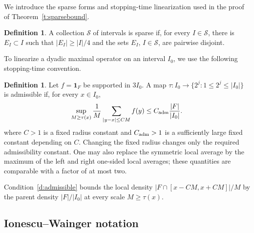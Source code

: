 \documentclass[12pt,reqno]{amsart}
\numberwithin{equation}{section}
\theoremstyle{definition}
\newtheorem{definition}[equation]{Definition}
\theoremstyle{remark}
\begin{document}
We introduce the sparse forms and stopping-time linearization used in
the proof of Theorem~\ref{t:sparsebound}.

\begin{definition}\label{d:sparse}
A collection $\mathcal S$ of intervals is sparse if, for every
$I\in\mathcal S$, there is $E_I\subset I$ such that
$|E_I|\geq|I|/4$ and the sets $E_I$, $I\in\mathcal S$, are pairwise
disjoint.
\end{definition}

To linearize a dyadic maximal operator on an interval $I_0$, we use the
following stopping-time convention.

\begin{definition}\label{d:admiss}
Let $f=\mathbf1_F$ be supported in $3I_0$.  A map $\tau:I_0\longrightarrow\{2^j:1\leq2^j\leq|I_0|\}$
is admissible if, for every $x\in I_0$,
\begin{align}\label{d:admissible}
 \sup_{M\geq\tau(x)}\frac1M
 \sum_{|y-x|\leq CM}f(y)
 \leq C_{\rm adm}\frac{|F|}{|I_0|}.
\end{align}
where $C>1$ is a fixed radius constant and $C_{\rm adm}>1$ is a
sufficiently large fixed constant depending on $C$.
Changing the fixed radius changes only the required admissibility
constant. One may also replace the symmetric local average by the
maximum of the left and right one-sided local averages; these
quantities are comparable with a factor of at most two.
\end{definition}

Condition~\eqref{d:admissible} bounds the local density
\(|F\cap[x-CM,x+CM]|/M\) by the parent density
\(|F|/|I_0|\) at every scale \(M\geq\tau(x)\).


\subsection{Ionescu--Wainger notation}
\end{document}
